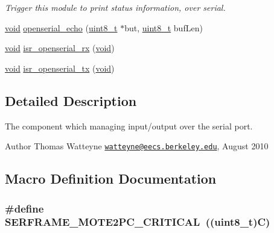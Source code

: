 \begin{DoxyCompactItemize}
\begin{DoxyCompactList}\small\item\em Trigger this module to print status information, over serial. \end{DoxyCompactList}\item 
\hyperlink{usb__devapi_8h_afabf60e7f57651d6d595a02c75f07cd0}{void} \hyperlink{group___open_serial_gac066477656140104a2b4e9b23b5371e2}{openserial\+\_\+echo} (\hyperlink{_p_e___types_8h_aba7bc1797add20fe3efdf37ced1182c5}{uint8\+\_\+t} $\ast$but, \hyperlink{_p_e___types_8h_aba7bc1797add20fe3efdf37ced1182c5}{uint8\+\_\+t} buf\+Len)
\item 
\hyperlink{usb__devapi_8h_afabf60e7f57651d6d595a02c75f07cd0}{void} \hyperlink{group___open_serial_ga253b4f5bec2de8f4f03c1732154cfd65}{isr\+\_\+openserial\+\_\+rx} (\hyperlink{usb__devapi_8h_afabf60e7f57651d6d595a02c75f07cd0}{void})
\item 
\hyperlink{usb__devapi_8h_afabf60e7f57651d6d595a02c75f07cd0}{void} \hyperlink{group___open_serial_ga4ac33c65ec6383bfa7df3e7b57d0b60e}{isr\+\_\+openserial\+\_\+tx} (\hyperlink{usb__devapi_8h_afabf60e7f57651d6d595a02c75f07cd0}{void})
\end{DoxyCompactItemize}


\subsection{Detailed Description}
The component which managing input/output over the serial port. 

\begin{DoxyAuthor}{Author}
Thomas Watteyne \href{mailto:watteyne@eecs.berkeley.edu}{\tt watteyne@eecs.\+berkeley.\+edu}, August 2010 
\end{DoxyAuthor}


\subsection{Macro Definition Documentation}
\subsubsection[{\texorpdfstring{S\+E\+R\+F\+R\+A\+M\+E\+\_\+\+M\+O\+T\+E2\+P\+C\+\_\+\+C\+R\+I\+T\+I\+C\+AL}{SERFRAME_MOTE2PC_CRITICAL}}]{\setlength{\rightskip}{0pt plus 5cm}\#define S\+E\+R\+F\+R\+A\+M\+E\+\_\+\+M\+O\+T\+E2\+P\+C\+\_\+\+C\+R\+I\+T\+I\+C\+AL~(({\bf uint8\+\_\+t})\textquotesingle{}C\textquotesingle{})}\hypertarget{group___open_serial_gab3f15a565c3666cc1c8d549eae65fa67}{}\label{group___open_serial_gab3f15a565c3666cc1c8d549eae65fa67}


